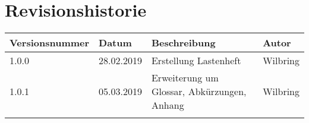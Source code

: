 \section*{Revisionshistorie}

\begin{tabular}{|p{3cm}|p{2cm}|p{5.5cm}|p{2cm}|}
\hline
Versionsnummer  & Datum         & Beschreibung          & Autor     \\
\hline
 1.0.0          & 28.02.2019    & Erstellung Lastenheft & Wilbring  \\\hline
 1.0.1          & 05.03.2019    & Erweiterung um Glossar, Abkürzungen, Anhang  & Wilbring      \\\hline
                &               &                       &           \\\hline
\end{tabular}

